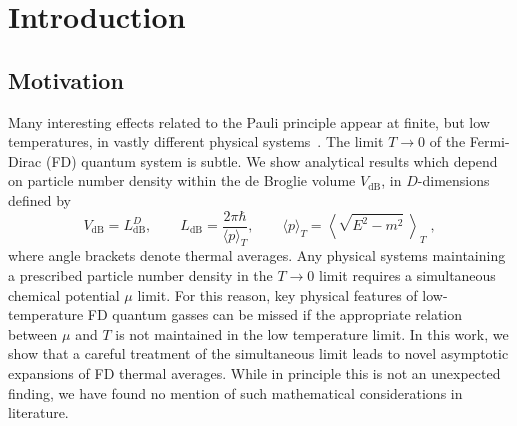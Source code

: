 \documentclass[sn-mathphys,Numbered]{sn-jnl}
\begin{document}

\maketitle
\section{Introduction}\label{Intro}
\subsection{Motivation}\label{Motivation}
Many interesting effects related to the Pauli principle appear at finite, but low temperatures, in vastly different physical systems~\cite{bludman1977equation,Elze:1980er,Ferrer:2019xlr,Kuebler:2021Th}. The limit $T\to 0$ of the Fermi-Dirac (FD) quantum system is subtle. We show analytical results which depend on particle number density within the de Broglie volume $V_\mathrm{dB}$, in $D$-dimensions defined by
\begin{equation}\label{dBVol}
V_\mathrm{dB}=L_\mathrm{dB}^D, \qquad L_\mathrm{dB}=
\frac{2\pi\hbar}{\langle p\rangle_T},\qquad \langle p\rangle_T=
\left\langle \sqrt{E^2-m^2}\ \right\rangle_T \;,
\end{equation}
 where angle brackets denote thermal averages. Any physical systems  maintaining a prescribed particle number density in the $T\to 0$ limit requires a simultaneous chemical potential $\mu$ limit. For this reason, key physical features of  low-temperature FD quantum gasses can be missed if the appropriate  relation between $\mu$ and $T$ is not maintained in the low temperature limit. In this work, we show that a careful treatment of the simultaneous limit leads to novel asymptotic expansions of FD thermal averages. While in principle this is not an unexpected finding, we have found no mention of such mathematical considerations in literature.
\end{document}
